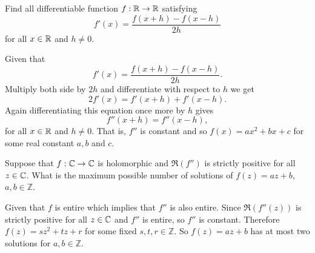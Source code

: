 \question Find all differentiable function $f:\mathbb{R}\to\mathbb{R}$ satisfying $$f'(x)=\frac{f(x+h)-f(x-h)}{2h}$$ for all $x\in\mathbb{R}$ and $h\neq0$.

\begin{solution}
    Given that $$f'(x)=\frac{f(x+h)-f(x-h)}{2h}.$$
    Multiply both side by $2h$ and differentiate with respect to $h$ we get $$2f'(x)=f'(x+h)+f'(x-h).$$
    Again differentiating this equation once more by $h$ gives $$f''(x+h)=f''(x-h),$$ for all $x\in\mathbb{R}$ and $h\neq0$. That is, $f''$ is constant and so $f(x)=ax^2+bx+c$ for some real constant $a,b$ and $c$.
\end{solution}

\question Suppose that $f:\mathbb{C}\to\mathbb{C}$ is holomorphic and $\Re{(f'')}$ is strictly positive for all $z\in\mathbb{C}$. What is the maximum possible number of solutions of $f(z)=az+b$, $a,b\in\mathbb{Z}$.

\begin{solution}
    Given that $f$ is entire which implies that $f''$ is also entire. Since $\Re{(f''(z))}$ is strictly positive for all $z\in\mathbb{C}$ and $f''$ is entire, so $f''$ is constant. Therefore $f(z)=sz^2+tz+r$ for some fixed $s,t,r\in\mathbb{Z}$. So $f(z)=az+b$ has at most two solutions for $a,b\in\mathbb{Z}$.
\end{solution}

